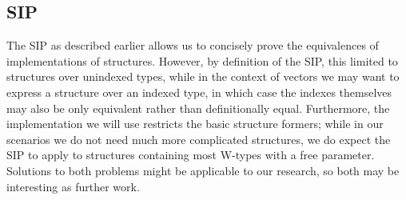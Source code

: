 \documentclass{article}
\theoremstyle{plain}%
\theoremstyle{definition}
\begin{document}
\subsection{SIP}
The SIP as described earlier allows us to concisely prove the equivalences of implementations of structures. However, by definition of the SIP, this limited to structures over unindexed types, while in the context of vectors we may want to express a structure over an indexed type, in which case the indexes themselves may also be only equivalent rather than definitionally equal. Furthermore, the implementation we will use \cite{iri} restricts the basic structure formers; while in our scenarios we do not need much more complicated structures, we do expect the SIP to apply to structures containing most W-types with a free parameter. Solutions to both problems might be applicable to our research, so both may be interesting as further work.

\end{document}
